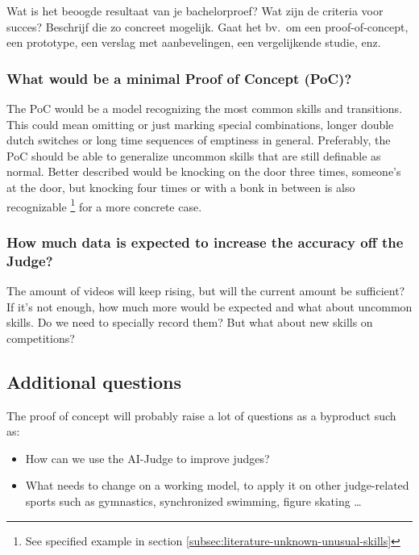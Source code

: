 Wat is het beoogde resultaat van je bachelorproef? Wat zijn de criteria voor succes? Beschrijf die zo concreet mogelijk. Gaat het bv.\ om een proof-of-concept, een prototype, een verslag met aanbevelingen, een vergelijkende studie, enz.

\subsubsection{What would be a minimal Proof of Concept (PoC)?}
\label{subsubsec:intro-question-poc}

The PoC would be a model recognizing the most common skills and transitions.
This could mean omitting or just marking special combinations, longer double dutch switches or long time sequences of emptiness in general. Preferably, the PoC should be able to generalize uncommon skills that are still definable as normal. Better described would be knocking on the door three times, someone's at the door, but knocking four times or with a bonk in between is also recognizable \footnote{See specified example in section \ref{subsec:literature-unknown-unusual-skills}} for a more concrete case.

\subsubsection{How much data is expected to increase the accuracy off the Judge?}
\label{subsubsec:intro-question-expected-data-to-increase-accuracy}

The amount of videos will keep rising, but will the current amount be sufficient? If it's not enough, how much more would be expected and what about uncommon skills. Do we need to specially record them? But what about new skills on competitions?

\subsection{Additional questions}
\label{subsubsec:intro-question-additional}

The proof of concept will probably raise a lot of questions as a byproduct such as:

\begin{itemize}
    \item How can we use the AI-Judge to improve judges?
    \item What needs to change on a working model, to apply it on other judge-related sports such as gymnastics, synchronized swimming, figure skating \dots
\end{itemize}


